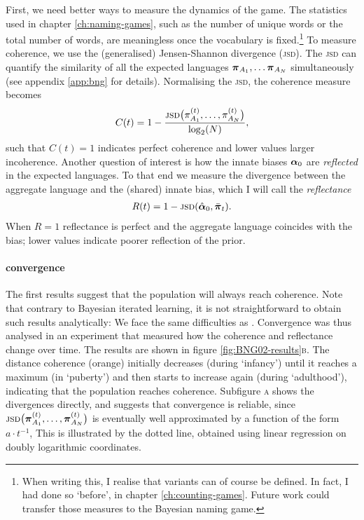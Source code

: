 \documentclass{../src/bcthesispart}
\begin{document}
First, we need better ways to measure the dynamics of the game.
The statistics used in chapter \ref{ch:naming-games}, such as the number of unique words or the total number of words, are meaningless once the vocabulary is fixed.\footnote{%
	When writing this, I realise that variants can of course be defined.
	In fact, I had done so ‘before’, in chapter \ref{ch:counting-games}.
	Future work could transfer those measures to the Bayesian naming game.
	}
To measure coherence, we use the (generalised) Jensen-Shannon divergence (\textsc{jsd}).
The \textsc{jsd} can quantify the similarity of all the expected languages $\vect\pi_{A_1},\dots\vect \pi_{A_N}$ simultaneously (see appendix \ref{app:bng} for details).
Normalising the \textsc{jsd}, the coherence measure becomes
\begin{equation}
	\label{eq:ch4:coherence}
	C(t) = 
		1 - \frac{\textsc{jsd}\bigl(\pi_{A_1}^{(t)}, \dots, \pi_{A_N}^{(t)}\bigr)}%
			{\log_2(N)},
\end{equation}
such that $C(t) = 1$ indicates perfect coherence and lower values larger incoherence.
Another question of interest is how the innate biases $\boldsymbol{\mathbf{\alpha}}_0$ are \emph{reflected} in the expected languages.
To that end we measure the divergence between the aggregate language and the (shared) innate bias, which I will call the \emph{reflectance}
\begin{align}
	R(t) = 1 - \textsc{jsd}(\hat{\boldsymbol{\mathbf{\alpha}}}_0, \bar{\boldsymbol{\mathbf{\pi}}}_t).
\end{align}
When $R=1$ reflectance is perfect and the aggregate language coincides with the bias; lower values indicate poorer reflection of the prior.






\paragraph{convergence}

The first results suggest that the population will always reach coherence.
Note that contrary to Bayesian iterated learning, it is not straightforward to obtain such results analytically: 
We face the same difficulties as \textcite{DeVylder2006}.
Convergence was thus analysed in an experiment that measured how the coherence and reflectance change over time.
The results are shown in figure \ref{fig:BNG02-results}\textsc{b}.
The distance coherence (orange) initially decreases (during ‘infancy’) until it reaches a maximum (in ‘puberty’) and then starts to increase again (during ‘adulthood’), indicating that the population reaches coherence.
Subfigure \textsc{a} shows the divergences directly, and suggests that convergence is reliable, since $\textsc{jsd}\bigl(\boldsymbol{\mathbf{\pi}}_{A_1}^{(t)}, \dots, \boldsymbol{\mathbf{\pi}}_{A_N}^{(t)}\bigr)$ is eventually well approximated by a function of the form $a \cdot t^{-1}$,
This is illustrated by the dotted line, obtained using linear regression on doubly logarithmic coordinates.
\end{document}

